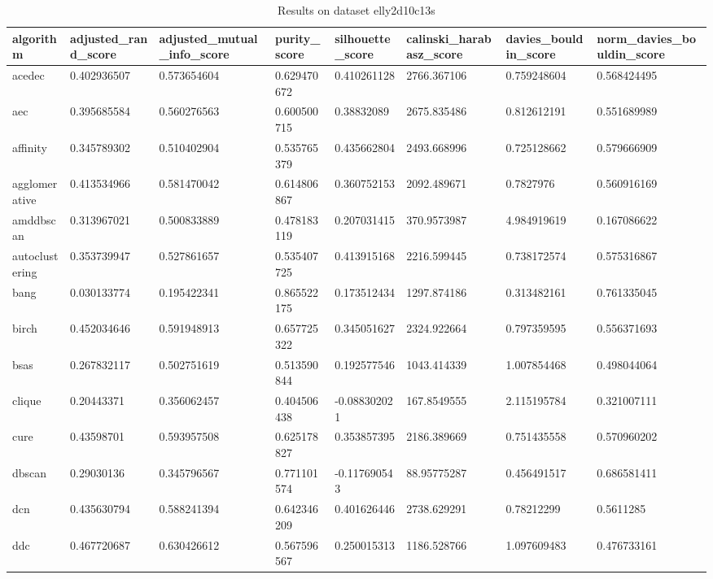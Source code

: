 \clearpage

\begin{table}[H]
\centering
\caption{Results on dataset elly2d10c13s}
\label{S62_Table}
\begin{tabular}{|l|l|l|l|l|l|l|l|}
\hline
algorithm & adjusted\_rand\_score & adjusted\_mutual\_info\_score & purity\_score & silhouette\_score & calinski\_harabasz\_score & davies\_bouldin\_score & norm\_davies\_bouldin\_score \\
\hline
acedec & 0.402936507 & 0.573654604 & 0.629470672 & 0.410261128 & 2766.367106 & 0.759248604 & 0.568424495 \\
\hline
aec & 0.395685584 & 0.560276563 & 0.600500715 & 0.38832089 & 2675.835486 & 0.812612191 & 0.551689989 \\
\hline
affinity & 0.345789302 & 0.510402904 & 0.535765379 & 0.435662804 & 2493.668996 & 0.725128662 & 0.579666909 \\
\hline
agglomerative & 0.413534966 & 0.581470042 & 0.614806867 & 0.360752153 & 2092.489671 & 0.7827976 & 0.560916169 \\
\hline
amddbscan & 0.313967021 & 0.500833889 & 0.478183119 & 0.207031415 & 370.9573987 & 4.984919619 & 0.167086622 \\
\hline
autoclustering & 0.353739947 & 0.527861657 & 0.535407725 & 0.413915168 & 2216.599445 & 0.738172574 & 0.575316867 \\
\hline
bang & 0.030133774 & 0.195422341 & 0.865522175 & 0.173512434 & 1297.874186 & 0.313482161 & 0.761335045 \\
\hline
birch & 0.452034646 & 0.591948913 & 0.657725322 & 0.345051627 & 2324.922664 & 0.797359595 & 0.556371693 \\
\hline
bsas & 0.267832117 & 0.502751619 & 0.513590844 & 0.192577546 & 1043.414339 & 1.007854468 & 0.498044064 \\
\hline
clique & 0.20443371 & 0.356062457 & 0.404506438 & -0.088302021 & 167.8549555 & 2.115195784 & 0.321007111 \\
\hline
cure & 0.43598701 & 0.593957508 & 0.625178827 & 0.353857395 & 2186.389669 & 0.751435558 & 0.570960202 \\
\hline
dbscan & 0.29030136 & 0.345796567 & 0.771101574 & -0.117690543 & 88.95775287 & 0.456491517 & 0.686581411 \\
\hline
dcn & 0.435630794 & 0.588241394 & 0.642346209 & 0.401626446 & 2738.629291 & 0.78212299 & 0.5611285 \\
\hline
ddc & 0.467720687 & 0.630426612 & 0.567596567 & 0.250015313 & 1186.528766 & 1.097609483 & 0.476733161 \\

\end{tabular}
\end{table}
